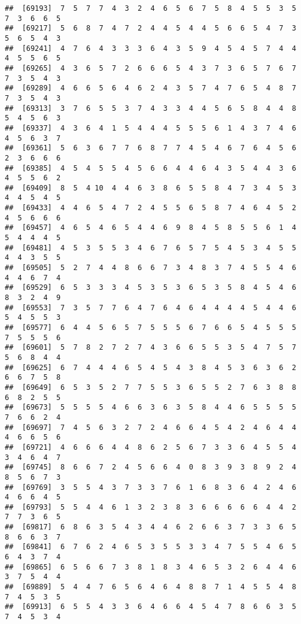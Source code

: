 \documentclass[
]{book}
\begin{document}
\begin{verbatim}
##  [69193]  7  5  7  7  4  3  2  4  6  5  6  7  5  8  4  5  5  3  5  7  3  6  6  5
##  [69217]  5  6  8  7  4  7  2  4  4  5  4  4  5  6  6  5  4  7  3  5  6  5  4  3
##  [69241]  4  7  6  4  3  3  3  6  4  3  5  9  4  5  4  5  7  4  4  4  5  5  6  5
##  [69265]  4  3  6  5  7  2  6  6  6  5  4  3  7  3  6  5  7  6  7  7  3  5  4  3
##  [69289]  4  6  6  5  6  4  6  2  4  3  5  7  4  7  6  5  4  8  7  7  3  5  4  3
##  [69313]  3  7  6  5  5  3  7  4  3  3  4  4  5  6  5  8  4  4  8  5  4  5  6  3
##  [69337]  4  3  6  4  1  5  4  4  4  5  5  5  6  1  4  3  7  4  6  4  5  6  3  7
##  [69361]  5  6  3  6  7  7  6  8  7  7  4  5  4  6  7  6  4  5  6  2  3  6  6  6
##  [69385]  4  5  4  5  5  4  5  6  6  4  4  6  4  3  5  4  4  3  6  4  5  5  6  2
##  [69409]  8  5  4 10  4  4  6  3  8  6  5  5  8  4  7  3  4  5  3  4  4  5  4  5
##  [69433]  4  4  6  5  4  7  2  4  5  5  6  5  8  7  4  6  4  5  2  4  5  6  6  6
##  [69457]  4  6  5  4  6  5  4  4  6  9  8  4  5  8  5  5  6  1  4  5  4  4  4  5
##  [69481]  4  5  3  5  5  3  4  6  7  6  5  7  5  4  5  3  4  5  5  4  4  3  5  5
##  [69505]  5  2  7  4  4  8  6  6  7  3  4  8  3  7  4  5  5  4  6  4  4  6  7  4
##  [69529]  6  5  3  3  3  4  5  3  5  3  6  5  3  5  8  4  5  4  6  8  3  2  4  9
##  [69553]  7  3  5  7  7  6  4  7  6  4  6  4  4  4  4  5  4  4  6  5  4  5  5  3
##  [69577]  6  4  4  5  6  5  7  5  5  5  6  7  6  6  5  4  5  5  5  7  5  5  5  6
##  [69601]  5  7  8  2  7  2  7  4  3  6  6  5  5  3  5  4  7  5  7  5  6  8  4  4
##  [69625]  6  7  4  4  4  6  5  4  5  4  3  8  4  5  3  6  3  6  2  6  6  7  5  8
##  [69649]  6  5  3  5  2  7  7  5  5  3  6  5  5  2  7  6  3  8  8  6  8  2  5  5
##  [69673]  5  5  5  5  4  6  6  3  6  3  5  8  4  4  6  5  5  5  5  7  6  6  2  4
##  [69697]  7  4  5  6  3  2  7  2  4  6  6  4  5  4  2  4  6  4  4  4  6  6  5  6
##  [69721]  4  6  6  6  4  4  8  6  2  5  6  7  3  3  6  4  5  5  4  3  4  6  4  7
##  [69745]  8  6  6  7  2  4  5  6  6  4  0  8  3  9  3  8  9  2  4  8  5  6  7  3
##  [69769]  3  5  5  4  3  7  3  3  7  6  1  6  8  3  6  4  2  4  6  4  6  6  4  5
##  [69793]  5  5  4  4  6  1  3  2  3  8  3  6  6  6  6  6  4  4  2  7  7  3  6  5
##  [69817]  6  8  6  3  5  4  3  4  4  6  2  6  6  3  7  3  3  6  5  8  6  6  3  7
##  [69841]  6  7  6  2  4  6  5  3  5  5  3  3  4  7  5  5  4  6  5  6  4  3  7  4
##  [69865]  6  5  6  6  7  3  8  1  8  3  4  6  5  3  2  6  4  4  6  3  7  5  4  4
##  [69889]  5  4  4  7  6  5  6  4  6  4  8  8  7  1  4  5  5  4  8  7  4  5  3  5
##  [69913]  6  5  5  4  3  3  6  4  6  6  4  5  4  7  8  6  6  3  5  7  4  5  3  4

\end{verbatim}
\end{document}
